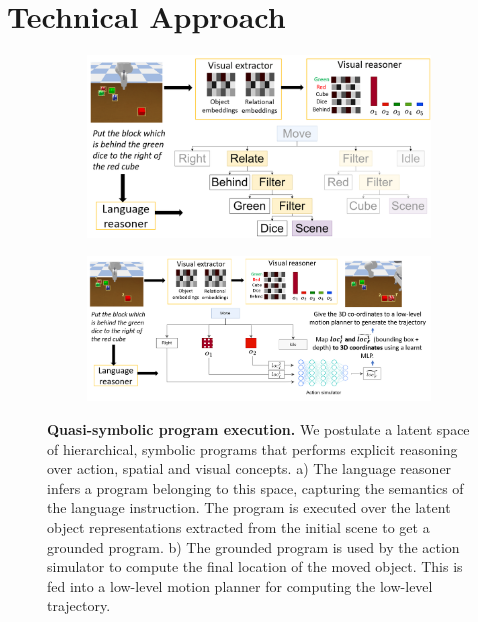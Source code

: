 \section{Technical Approach}
\begin{figure}[htbp]
  \centering
  \begin{subfigure}[b]{0.4\textwidth}
    \includegraphics[width=\textwidth]{figures/example-1-n.png}
    \caption{}
    \label{fig:approach2}
  \end{subfigure}\hfill
  \begin{subfigure}[b]{0.5\textwidth}
    \includegraphics[width=\textwidth]{figures/example-2-n.png}
          \caption{}
    \label{fig:approach1}
  \end{subfigure}
   
  \caption{\footnotesize{\textbf{Quasi-symbolic program execution.} We postulate a latent space of hierarchical, symbolic programs that performs explicit reasoning over action, spatial and visual concepts. a) The language reasoner infers a program belonging to this space, capturing the semantics of the language instruction. The program is executed over the latent object representations extracted from the initial scene to get a grounded program. b) The grounded program is used by the action simulator to compute the final location of the moved object. This is fed into a low-level motion planner for computing the low-level trajectory.}}
  \label{fig:approach}
  \vspace{-0.1 in}
\end{figure}

